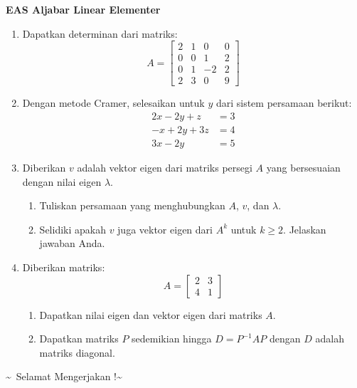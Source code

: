 \documentclass[12pt]{article}
\begin{document}
\begin{center}
    \textbf{EAS Aljabar Linear Elementer}
\end{center}

\vspace{0.5cm}

\begin{enumerate}
    \item Dapatkan determinan dari matriks:
    \[
    A = \begin{bmatrix}
    2 & 1 & 0 & 0 \\
    0 & 0 & 1 & 2 \\
    0 & 1 & -2 & 2 \\
    2 & 3 & 0 & 9
    \end{bmatrix}
    \]

    \item Dengan metode Cramer, selesaikan untuk $y$ dari sistem persamaan berikut:
    \[
    \begin{aligned}
    2x - 2y + z &= 3 \\
    -x + 2y + 3z &= 4 \\
    3x - 2y &= 5
    \end{aligned}
    \]

    \item Diberikan $v$ adalah vektor eigen dari matriks persegi $A$ yang bersesuaian dengan nilai eigen $\lambda$.
    \begin{enumerate}[label=\alph*.]
        \item Tuliskan persamaan yang menghubungkan $A$, $v$, dan $\lambda$.
        \item Selidiki apakah $v$ juga vektor eigen dari $A^k$ untuk $k \geq 2$. Jelaskan jawaban Anda.
    \end{enumerate}

    \item Diberikan matriks:
    \[
    A = \begin{bmatrix}
    2 & 3 \\
    4 & 1
    \end{bmatrix}
    \]
    \begin{enumerate}[label=\alph*.]
        \item Dapatkan nilai eigen dan vektor eigen dari matriks $A$.
        \item Dapatkan matriks $P$ sedemikian hingga $D = P^{-1} A P$ dengan $D$ adalah matriks diagonal.
    \end{enumerate}
\end{enumerate}

\vspace{1cm}
\begin{center}
    \textasciitilde\ Selamat Mengerjakan !\textasciitilde
\end{center}
\end{document}
